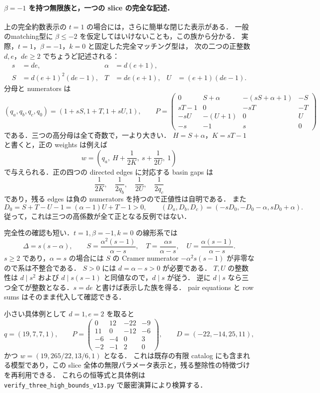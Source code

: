 \paragraph{$\beta=-1$ を持つ無限族と，一つの slice の完全な記述．}
\label{nsch18:beta-minus-one}
上の完全約数表示の $t=1$ の場合には，さらに簡単な閉じた表示がある．
一般のmatching型に $\beta\leq-2$ を仮定してはいけないことも，この族から分かる．
実際，$t=1$，$\beta=-1$，$k=0$ と固定した完全マッチング型は，
次の二つの正整数 $d,e$，$de\geq2$ でちょうど記述される：
\begin{align*}
 s&=de,&\alpha&=d(e+1),\\
 S&=d(e+1)^2(de-1),&
 T&=de(e+1),&
 U&=(e+1)(de-1).
\end{align*}
分母と numerators は
\[
 (q_a,q_b,q_c,q_0)=(1+sS,1+T,1+sU,1),
 \qquad
 P=\begin{pmatrix}
 0&S+\alpha&-(sS+\alpha+1)&-S\\
 sT-1&0&-sT&-T\\
 -sU&-(U+1)&0&U\\
 -s&-1&s&0
 \end{pmatrix}
\]
である．三つの高分母は全て奇数で，一より大きい．
$H=S+\alpha$，$K=sT-1$ と書くと，正の weights は例えば
\[
 w=\left(q_a,\ H+\frac1{2K},\ s+\frac1{2U},\ 1\right)
\]
で与えられる．正の四つの directed edges に対応する basin gaps は
\[
 \frac1{2K},\quad\frac1{2q_b},\quad\frac1{2U},\quad\frac1{2q_c}
\]
であり，残る edges は負の numerators を持つので正値性は自明である．
また
\[
 D_0=S+T-U-1=(\alpha-1)U+T-1>0,
 \qquad
 (D_a,D_b,D_c)=(-sD_0,-D_0-\alpha,sD_0+\alpha).
\]
従って，これは三つの高係数が全て正となる反例ではない．

完全性の確認も短い．$t=1,\beta=-1,k=0$ の線形系では
\[
 \Delta=s(s-\alpha),\qquad
 S=\frac{\alpha^2(s-1)}{\alpha-s},\quad
 T=\frac{\alpha s}{\alpha-s},\quad
 U=\frac{\alpha(s-1)}{\alpha-s}.
\]
$s\geq2$ であり，$\alpha=s$ の場合には $S$ の Cramer numerator
$-\alpha^2s(s-1)$ が非零なので系は不整合である．
$S>0$ には $d=\alpha-s>0$ が必要である．
$T,U$ の整数性は $d\mid s^2$ および $d\mid s(s-1)$ と同値なので，$d\mid s$ が従う．
逆に $d\mid s$ なら三つ全てが整数となる．$s=de$ と書けば表示した族を得る．
pair equations と row sums はそのまま代入して確認できる．

小さい具体例として $d=1,e=2$ を取ると
\[
 q=(19,7,7,1),\qquad
 P=\begin{pmatrix}
 0&12&-22&-9\\
 11&0&-12&-6\\
 -6&-4&0&3\\
 -2&-1&2&0
 \end{pmatrix},\qquad
 D=(-22,-14,25,11),
\]
かつ $w=(19,265/22,13/6,1)$ となる．
これは既存の有限 catalog にも含まれる模型であり，この slice 全体の無限パラメータ表示と，残る整除性の特徴づけを再利用できる．
これらの恒等式と具体例は \texttt{verify\_three\_high\_bounds\_v13.py} で厳密演算により検算する．

